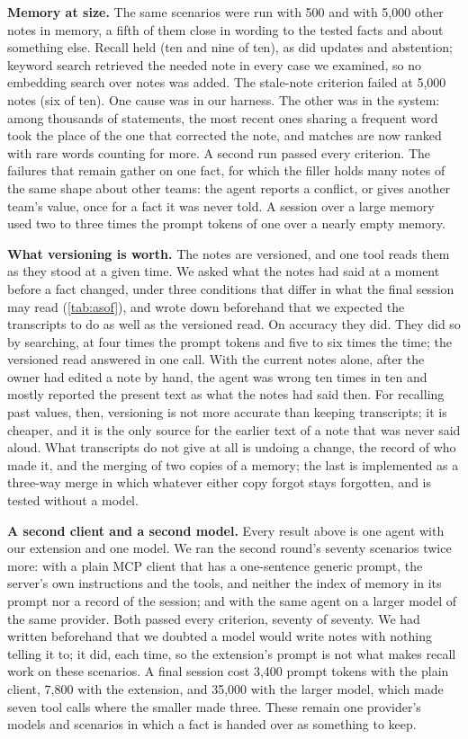 \documentclass[11pt,letterpaper]{article}
\begin{document}
\textbf{Memory at size.} The same scenarios were run with 500 and with 5,000 other notes in memory, a fifth of them close in wording to the tested facts and about something else. Recall held (ten and nine of ten), as did updates and abstention; keyword search retrieved the needed note in every case we examined, so no embedding search over notes was added. The stale-note criterion failed at 5,000 notes (six of ten). One cause was in our harness. The other was in the system: among thousands of statements, the most recent ones sharing a frequent word took the place of the one that corrected the note, and matches are now ranked with rare words counting for more. A second run passed every criterion. The failures that remain gather on one fact, for which the filler holds many notes of the same shape about other teams: the agent reports a conflict, or gives another team's value, once for a fact it was never told. A session over a large memory used two to three times the prompt tokens of one over a nearly empty memory.

\textbf{What versioning is worth.} The notes are versioned, and one tool reads them as they stood at a given time. We asked what the notes had said at a moment before a fact changed, under three conditions that differ in what the final session may read (\cref{tab:asof}), and wrote down beforehand that we expected the transcripts to do as well as the versioned read. On accuracy they did. They did so by searching, at four times the prompt tokens and five to six times the time; the versioned read answered in one call. With the current notes alone, after the owner had edited a note by hand, the agent was wrong ten times in ten and mostly reported the present text as what the notes had said then. For recalling past values, then, versioning is not more accurate than keeping transcripts; it is cheaper, and it is the only source for the earlier text of a note that was never said aloud. What transcripts do not give at all is undoing a change, the record of who made it, and the merging of two copies of a memory; the last is implemented as a three-way merge in which whatever either copy forgot stays forgotten, and is tested without a model.

\textbf{A second client and a second model.} Every result above is one agent with our extension and one model. We ran the second round's seventy scenarios twice more: with a plain MCP client that has a one-sentence generic prompt, the server's own instructions and the tools, and neither the index of memory in its prompt nor a record of the session; and with the same agent on a larger model of the same provider. Both passed every criterion, seventy of seventy. We had written beforehand that we doubted a model would write notes with nothing telling it to; it did, each time, so the extension's prompt is not what makes recall work on these scenarios. A final session cost 3,400 prompt tokens with the plain client, 7,800 with the extension, and 35,000 with the larger model, which made seven tool calls where the smaller made three. These remain one provider's models and scenarios in which a fact is handed over as something to keep.
\end{document}
